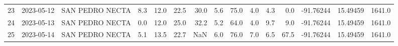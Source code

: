 \documentclass[12pt]{article}
\begin{document}
\begin{center}
\begin{tabular}{lllrrrrrrrrrrrr}
23  & 2023-05-12 &  SAN PEDRO NECTA &     8.3 &  12.0 &   22.5 &  30.0 &        5.6 &     75.0 &  4.0 &         4.3 &         0.0 & -91.76244 &  15.49459 &   1641.0 \\
24  & 2023-05-13 &  SAN PEDRO NECTA &     0.0 &  12.0 &   25.0 &  32.2 &        5.2 &     64.0 &  4.0 &         9.7 &         9.0 & -91.76244 &  15.49459 &   1641.0 \\
25  & 2023-05-14 &  SAN PEDRO NECTA &     5.1 &  13.5 &   22.7 &   NaN &        6.0 &     76.0 &  7.0 &         6.5 &        67.5 & -91.76244 &  15.49459 &   1641.0 \\
\bottomrule
\end{tabular}

        
        \end{center}
        
\end{document}
